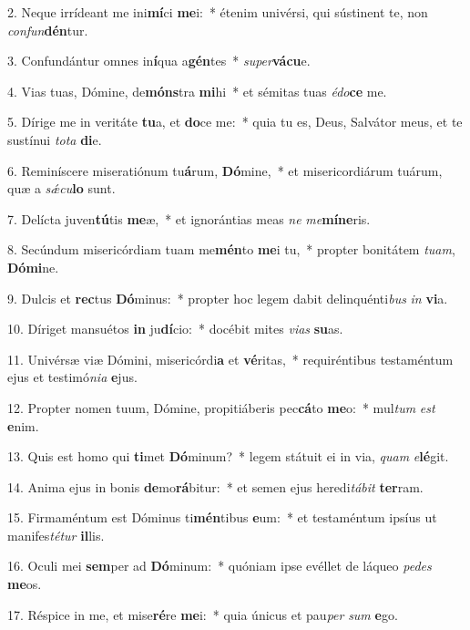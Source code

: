 2. Neque irrídeant me ini\textbf{mí}ci \textbf{me}i:~*  étenim univérsi, qui sústinent te, non \textit{con}\textit{fun}\textbf{dén}tur.\

3. Confundántur omnes in\textbf{í}qua a\textbf{gén}tes~*  \textit{su}\textit{per}\textbf{vá}\textbf{cu}e.\

4. Vias tuas, Dómine, de\textbf{móns}tra \textbf{mi}hi~*  et sémitas tuas \textit{é}\textit{do}\textbf{ce} me.\

5. Dírige me in veritáte \textbf{tu}a, et \textbf{do}ce me:~*  quia tu es, Deus, Salvátor meus, et te sustínui \textit{to}\textit{ta} \textbf{di}e.\

6. Reminíscere miseratiónum tu\textbf{á}rum, \textbf{Dó}mine,~*  et misericordiárum tuárum, quæ a \textit{sǽ}\textit{cu}\textbf{lo} sunt.\

7. Delícta juven\textbf{tú}tis \textbf{me}æ,~*  et ignorántias meas \textit{ne} \textit{me}\textbf{mí}\textbf{ne}ris.\

8. Secúndum misericórdiam tuam me\textbf{mén}to \textbf{me}i tu,~*  propter bonitátem \textit{tu}\textit{am}, \textbf{Dó}\textbf{mi}ne.\

9. Dulcis et \textbf{rec}tus \textbf{Dó}minus:~*  propter hoc legem dabit delinquénti\textit{bus} \textit{in} \textbf{vi}a.\

10. Díriget mansuétos \textbf{in} ju\textbf{dí}cio:~*  docébit mites \textit{vi}\textit{as} \textbf{su}as.\

11. Univérsæ viæ Dómini, misericórdi\textbf{a} et \textbf{vé}ritas,~*  requiréntibus testaméntum ejus et testimó\textit{ni}\textit{a} \textbf{e}jus.\

12. Propter nomen tuum, Dómine, propitiáberis pec\textbf{cá}to \textbf{me}o:~*  mul\textit{tum} \textit{est} \textbf{e}nim.\

13. Quis est homo qui \textbf{ti}met \textbf{Dó}minum?~*  legem státuit ei in via, \textit{quam} \textit{e}\textbf{lé}git.\

14. Anima ejus in bonis \textbf{de}mo\textbf{rá}bitur:~*  et semen ejus heredi\textit{tá}\textit{bit} \textbf{ter}ram.\

15. Firmaméntum est Dóminus ti\textbf{mén}tibus \textbf{e}um:~*  et testaméntum ipsíus ut manifes\textit{té}\textit{tur} \textbf{il}lis.\

16. Oculi mei \textbf{sem}per ad \textbf{Dó}minum:~*  quóniam ipse evéllet de láqueo \textit{pe}\textit{des} \textbf{me}os.\

17. Réspice in me, et mise\textbf{ré}re \textbf{me}i:~*  quia únicus et pau\textit{per} \textit{sum} \textbf{e}go.\

